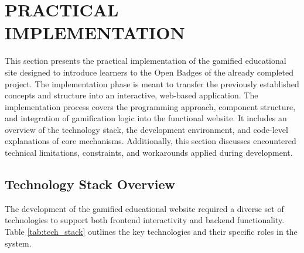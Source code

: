 \section{PRACTICAL IMPLEMENTATION}

This section presents the practical implementation of the gamified educational site designed to introduce learners to the Open Badges of the already completed project. 
The implementation phase is meant to transfer the previously established concepts and structure into an interactive, web-based application. 
The implementation process covers the programming approach, component structure, and integration of gamification logic into the functional website. 
It includes an overview of the technology stack, the development environment, and code-level explanations of core mechanisms.
Additionally, this section discusses encountered technical limitations, constraints, and workarounds applied during development.

\subsection{Technology Stack Overview}

The development of the gamified educational website required a diverse set of technologies to support both frontend interactivity and backend functionality. 
Table \ref{tab:tech_stack} outlines the key technologies and their specific roles in the system.

